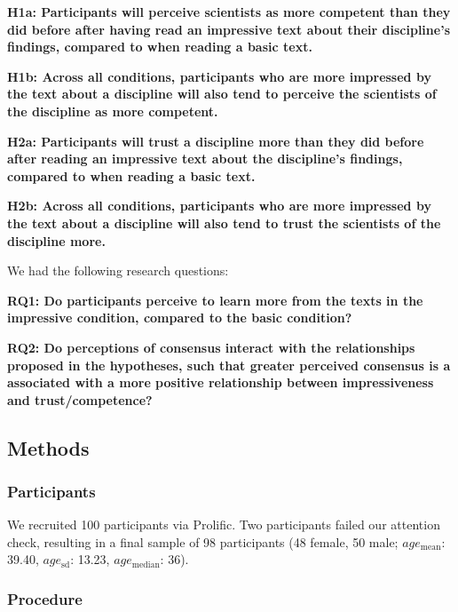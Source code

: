 \documentclass[
  doc,floatsintext]{apa6}
\begin{document}
\textbf{H1a: Participants will perceive scientists as more competent than they did before after having read an impressive text about their discipline's findings, compared to when reading a basic text.}

\textbf{H1b: Across all conditions, participants who are more impressed by the text about a discipline will also tend to perceive the scientists of the discipline as more competent.}

\textbf{H2a: Participants will trust a discipline more than they did before after reading an impressive text about the discipline's findings, compared to when reading a basic text.}

\textbf{H2b: Across all conditions, participants who are more impressed by the text about a discipline will also tend to trust the scientists of the discipline more.}

We had the following research questions:

\textbf{RQ1: Do participants perceive to learn more from the texts in the impressive condition, compared to the basic condition?}

\textbf{RQ2: Do perceptions of consensus interact with the relationships proposed in the hypotheses, such that greater perceived consensus is a associated with a more positive relationship between impressiveness and trust/competence?}

\hypertarget{methods}{%
\subsection{Methods}\label{methods}}

\hypertarget{participants}{%
\subsubsection{Participants}\label{participants}}

We recruited 100 participants via Prolific. Two participants failed our attention check, resulting in a final sample of 98 participants (48 female, 50 male; \(age_\text{mean}\): 39.40, \(age_\text{sd}\): 13.23, \(age_\text{median}\): 36).

\hypertarget{procedure}{%
\subsubsection{Procedure}\label{procedure}}
\end{document}
